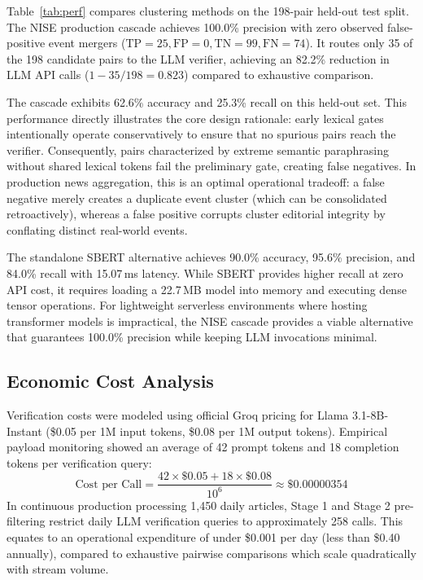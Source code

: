\documentclass[conference]{IEEEtran}
\begin{document}
Table~\ref{tab:perf} compares clustering methods on the 198-pair held-out test split.
The NISE production cascade achieves 100.0\% precision with zero observed false-positive event mergers ($\text{TP}=25, \text{FP}=0, \text{TN}=99, \text{FN}=74$).
It routes only 35 of the 198 candidate pairs to the LLM verifier, achieving an 82.2\% reduction in LLM API calls ($1 - 35/198 = 0.823$) compared to exhaustive comparison.

The cascade exhibits 62.6\% accuracy and 25.3\% recall on this held-out set.
This performance directly illustrates the core design rationale: early lexical gates intentionally operate conservatively to ensure that no spurious pairs reach the verifier.
Consequently, pairs characterized by extreme semantic paraphrasing without shared lexical tokens fail the preliminary gate, creating false negatives.
In production news aggregation, this is an optimal operational tradeoff: a false negative merely creates a duplicate event cluster (which can be consolidated retroactively), whereas a false positive corrupts cluster editorial integrity by conflating distinct real-world events.

The standalone SBERT alternative achieves 90.0\% accuracy, 95.6\% precision, and 84.0\% recall with 15.07\,ms latency.
While SBERT provides higher recall at zero API cost, it requires loading a 22.7\,MB model into memory and executing dense tensor operations.
For lightweight serverless environments where hosting transformer models is impractical, the NISE cascade provides a viable alternative that guarantees 100.0\% precision while keeping LLM invocations minimal.

\subsection{Economic Cost Analysis}
Verification costs were modeled using official Groq pricing for Llama 3.1-8B-Instant (\$0.05 per 1M input tokens, \$0.08 per 1M output tokens).
Empirical payload monitoring showed an average of 42 prompt tokens and 18 completion tokens per verification query:
\begin{equation}
\text{Cost per Call} = \frac{42 \times \$0.05 + 18 \times \$0.08}{10^6} \approx \$0.00000354
\end{equation}
In continuous production processing 1,450 daily articles, Stage 1 and Stage 2 pre-filtering restrict daily LLM verification queries to approximately 258 calls.
This equates to an operational expenditure of under \$0.001 per day (less than \$0.40 annually), compared to exhaustive pairwise comparisons which scale quadratically with stream volume.
\end{document}
